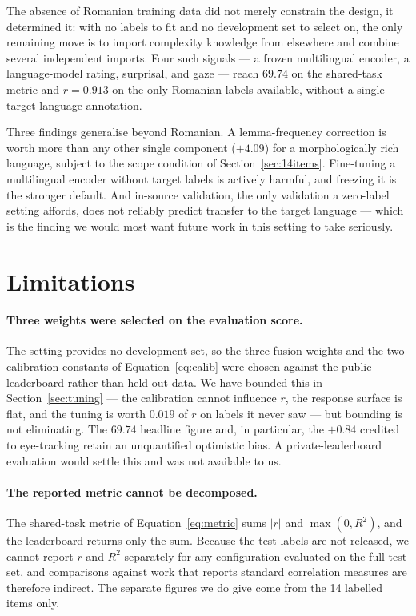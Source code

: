 \documentclass[11pt]{article}
\begin{document}
The absence of Romanian training data did not merely constrain the
design, it determined it: with no labels to fit and no development set
to select on, the only remaining move is to import complexity knowledge
from elsewhere and combine several independent imports. Four such
signals --- a frozen multilingual encoder, a language-model rating,
surprisal, and gaze --- reach $69.74$ on the shared-task metric and
$r = 0.913$ on the only Romanian labels available, without a single
target-language annotation.

Three findings generalise beyond Romanian. A lemma-frequency correction
is worth more than any other single component ($+4.09$) for a
morphologically rich language, subject to the scope condition of
Section~\ref{sec:14items}. Fine-tuning a multilingual encoder without
target labels is actively harmful, and freezing it is the stronger
default. And in-source validation, the only validation a zero-label
setting affords, does not reliably predict transfer to the target
language --- which is the finding we would most want future work in
this setting to take seriously.

\section*{Limitations}

\paragraph{Three weights were selected on the evaluation score.}
The setting provides no development set, so the three fusion weights
and the two calibration constants of Equation~\ref{eq:calib} were
chosen against the public leaderboard rather than held-out data. We
have bounded this in Section~\ref{sec:tuning} --- the calibration
cannot influence $r$, the response surface is flat, and the tuning is
worth $0.019$ of $r$ on labels it never saw --- but bounding is not
eliminating. The $69.74$ headline figure and, in particular, the
$+0.84$ credited to eye-tracking retain an unquantified optimistic
bias. A private-leaderboard evaluation would settle this and was not
available to us.

\paragraph{The reported metric cannot be decomposed.}
The shared-task metric of Equation~\ref{eq:metric} sums $|r|$ and
$\max(0,R^2)$, and the leaderboard returns only the sum. Because the
test labels are not released, we cannot report $r$ and $R^2$ separately
for any configuration evaluated on the full test set, and comparisons
against work that reports standard correlation measures are therefore
indirect. The separate figures we do give come from the 14 labelled
items only.
\end{document}
